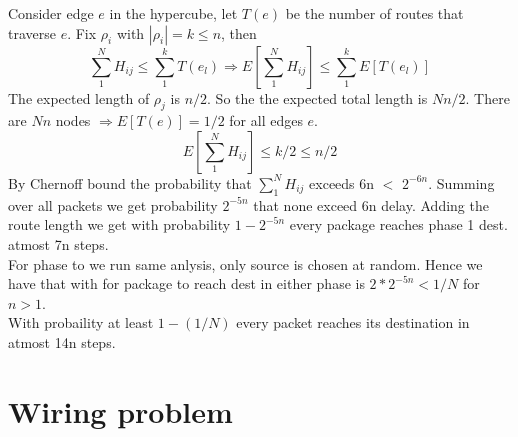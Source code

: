 \documentclass[a4paper]{article}
\begin{document}
Consider edge \(e\) in the hypercube, let \(T(e)\) be the number of routes that traverse \(e\). Fix \(\rho_i\) with \(|\rho_i| = k \leq n\), then
\[\sum_1^N H_{ij} \leq \sum_1^k T(e_l) \Rightarrow E[\sum_1^N H_{ij}] \leq \sum_1^k E[T(e_l)]\]
The expected length of \(\rho_j\) is \(n/2\). So the the expected total length is \(Nn/2\). There are \(Nn\) nodes \(\Rightarrow E[T(e)]= 1/2\) for all edges \(e\).
\[E[\sum_1^N H_{ij}] \leq k/2 \leq n/2\]
By Chernoff bound the probability that \(\sum_1^N H_{ij}\) exceeds 6n \(<\) \(2^{-6n}\). Summing over all packets we get probability \(2^{-5n}\) that none exceed 6n delay. Adding the route length we get with probability \(1-2^{-5n}\) every package reaches phase 1 dest. atmost 7n steps.\\
For phase to we run same anlysis, only source is chosen at random. Hence we have that with for package to reach dest in either phase is \(2*2^{-5n} < 1/N\) for \(n>1\).\\
With probaility at least \(1-(1/N)\) every packet reaches its destination in atmost 14n steps. 
\section{Wiring problem}
\end{document}
